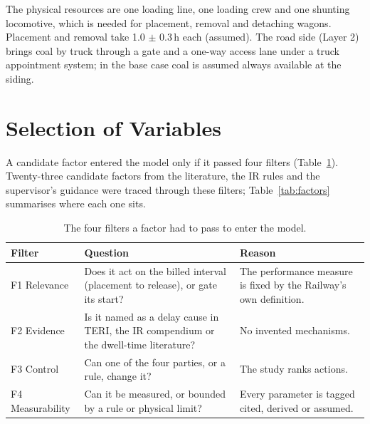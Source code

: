 The physical resources are one loading line, one loading crew and one shunting locomotive, which is needed for placement, removal and detaching wagons. Placement and removal take 1.0 $\pm$ 0.3\,h each (assumed). The road side (Layer 2) brings coal by truck through a gate and a one-way access lane under a truck appointment system; in the base case coal is assumed always available at the siding.

\section{Selection of Variables}
\label{sec:selection}
A candidate factor entered the model only if it passed four filters (Table~\ref{tab:filters}). Twenty-three candidate factors from the literature, the IR rules and the supervisor's guidance were traced through these filters; Table~\ref{tab:factors} summarises where each one sits.

\begin{table}[!htbp]
\centering
\caption[The four filters a factor had to pass to enter the model]{The four filters a factor had to pass to enter the model.}
\label{tab:filters}
\small
\begin{tabularx}{\textwidth}{@{}l X X@{}}
\toprule
\textbf{Filter} & \textbf{Question} & \textbf{Reason} \\
\midrule
F1 Relevance & Does it act on the billed interval (placement to release), or gate its start? & The performance measure is fixed by the Railway's own definition. \\
F2 Evidence & Is it named as a delay cause in TERI, the IR compendium or the dwell-time literature? & No invented mechanisms. \\
F3 Control & Can one of the four parties, or a rule, change it? & The study ranks actions. \\
F4 Measurability & Can it be measured, or bounded by a rule or physical limit? & Every parameter is tagged cited, derived or assumed. \\
\bottomrule
\end{tabularx}
\end{table}

